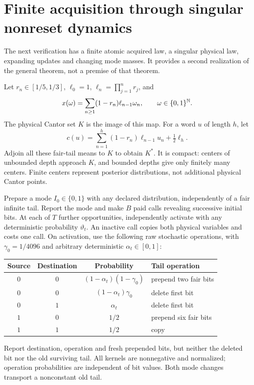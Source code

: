 \section{Finite acquisition through singular nonreset dynamics}\label{sec:singular}
The next verification has a finite atomic acquired law, a singular physical law, expanding updates and changing mode masses. It provides a second realization of the general theorem, not a premise of that theorem.

Let $r_n\in[1/5,1/3]$, $\ell_0=1$, $\ell_n=\prod_{j=1}^n r_j$, and
\[
 x(\omega)=\sum_{n\ge1}(1-r_n)\ell_{n-1}\omega_n,
 \qquad \omega\in\{0,1\}^{\mathbb N}.
\]
The physical Cantor set $K$ is the image of this map. For a word $u$ of length $h$, let
\[
 c(u)=\sum_{n=1}^h(1-r_n)\ell_{n-1}u_n+\tfrac12\ell_h.
\]
Adjoin all these fair-tail means to $K$ to obtain $K^*$. It is compact: centers of unbounded depth approach $K$, and bounded depths give only finitely many centers. Finite centers represent posterior distributions, not additional physical Cantor points.

Prepare a mode $I_0\in\{0,1\}$ with any declared distribution, independently of a fair infinite tail. Report the mode and make $B$ paid calls revealing successive initial bits. At each of $T$ further opportunities, independently activate with any deterministic probability $\vartheta_t$. An inactive call copies both physical variables and costs one call. On activation, use the following raw stochastic operations, with $\gamma_0=1/4096$ and arbitrary deterministic $\alpha_t\in[0,1]$:
\begin{center}\small
\begin{tabular}{cccl}
\toprule
Source & Destination & Probability & Tail operation\\\midrule
$0$&$0$&$(1-\alpha_t)(1-\gamma_0)$&prepend two fair bits\\
$0$&$0$&$(1-\alpha_t)\gamma_0$&delete first bit\\
$0$&$1$&$\alpha_t$&delete first bit\\
$1$&$0$&$1/2$&prepend six fair bits\\
$1$&$1$&$1/2$&copy\\\bottomrule
\end{tabular}\end{center}
Report destination, operation and fresh prepended bits, but neither the deleted bit nor the old surviving tail. All kernels are nonnegative and normalized; operation probabilities are independent of bit values. Both mode changes transport a nonconstant old tail.


